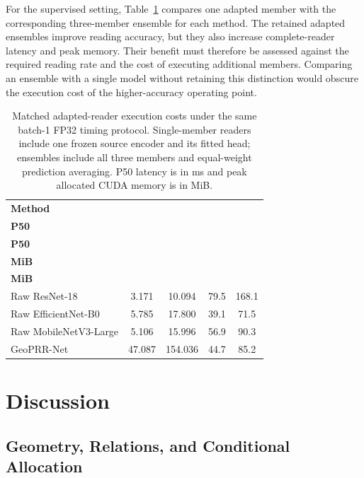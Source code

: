 \documentclass[electronics,article,submit,oneauthor]{Definitions/mdpi}
\newcommand{\modelname}{GeoPRR-Net\xspace}
\begin{document}
For the supervised setting, Table~\ref{tab:adapted_efficiency} compares one adapted member with the corresponding three-member ensemble for each method. The retained adapted ensembles improve reading accuracy, but they also increase complete-reader latency and peak memory. Their benefit must therefore be assessed against the required reading rate and the cost of executing additional members. Comparing an ensemble with a single model without retaining this distinction would obscure the execution cost of the higher-accuracy operating point.

\begin{table}[H]
\caption{Matched adapted-reader execution costs under the same batch-1 FP32 timing protocol. Single-member readers include one frozen source encoder and its fitted head; ensembles include all three members and equal-weight prediction averaging. P50 latency is in ms and peak allocated CUDA memory is in MiB.}
\label{tab:adapted_efficiency}
\centering
\small
\begin{tabularx}{\textwidth}{@{}>{\raggedright\arraybackslash}Xcccc@{}}
\toprule
\textbf{Method} & \shortstack{\textbf{Single}\\\textbf{P50}} & \shortstack{\textbf{Ensemble}\\\textbf{P50}} & \shortstack{\textbf{Single}\\\textbf{MiB}} & \shortstack{\textbf{Ensemble}\\\textbf{MiB}} \\
\midrule

Raw ResNet-18 & 3.171 & 10.094 & 79.5 & 168.1 \\

Raw EfficientNet-B0 & 5.785 & 17.800 & 39.1 & 71.5 \\

Raw MobileNetV3-Large & 5.106 & 15.996 & 56.9 & 90.3 \\

\modelname & 47.087 & 154.036 & 44.7 & 85.2 \\

\bottomrule
\end{tabularx}
\end{table}


\section{Discussion}
\label{sec:discussion}

\subsection{Geometry, Relations, and Conditional Allocation}
\end{document}
